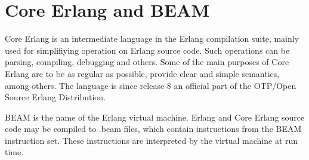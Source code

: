 \section{Core Erlang and BEAM}



Core Erlang \cite{CoreErlangIntro} is an intermediate language in the Erlang compilation suite, mainly used for simplifiying operation on Erlang source code. Such operations can be parsing, compiling, debugging and others. Some of the main purposes of Core Erlang are to be as regular as possible, provide clear and simple semantics, among others. The language is since release 8 an official part of the OTP/Open Source Erlang Distribution.

BEAM is the name of the Erlang virtual machine. Erlang and Core Erlang source code may be compiled to .beam files, which contain instructions from the BEAM instruction set. These instructions are interpreted by the virtual machine at run time.
